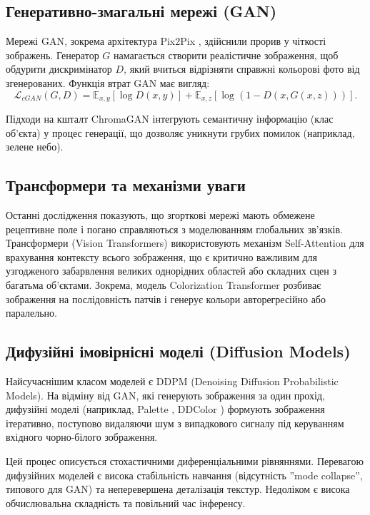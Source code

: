     \subsection{Генеративно-змагальні мережі (GAN)}
        Мережі GAN, зокрема архітектура Pix2Pix \cite{2017-image-to-image-translation}, здійснили прорив у чіткості зображень.
        Генератор $G$ намагається створити реалістичне зображення, щоб обдурити дискримінатор $D$, який вчиться відрізняти справжні кольорові фото від згенерованих.
        Функція втрат GAN має вигляд:
        $$ \mathcal{L}_{cGAN}(G, D) = \mathbb{E}_{x, y}[\log D(x, y)] + \mathbb{E}_{x, z}[\log(1 - D(x, G(x, z)))]. $$
    
    Підходи на кшталт ChromaGAN \cite{2020-chromagan} інтегрують семантичну інформацію (клас об'єкта) у процес генерації, що дозволяє уникнути грубих помилок (наприклад, зелене небо).

    \subsection{Трансформери та механізми уваги}
        Останні дослідження \cite{2021-colorization-transformer, 2022-unicolor} показують, що згорткові мережі мають обмежене рецептивне поле і погано справляються з моделюванням глобальних зв'язків.
        Трансформери (Vision Transformers) використовують механізм Self-Attention для врахування контексту всього зображення, що є критично важливим для узгодженого забарвлення великих однорідних областей або складних сцен з багатьма об'єктами.
        Зокрема, модель Colorization Transformer розбиває зображення на послідовність патчів і генерує кольори авторегресійно або паралельно.

    \subsection{Дифузійні імовірнісні моделі (Diffusion Models)}
        Найсучаснішим класом моделей є DDPM (Denoising Diffusion Probabilistic Models).
        На відміну від GAN, які генерують зображення за один прохід, дифузійні моделі (наприклад, Palette \cite{2022-palette-image-to-image-diffusion-models}, DDColor \cite{2023-ddcolor}) формують зображення ітеративно, поступово видаляючи шум з випадкового сигналу під керуванням вхідного чорно-білого зображення.


        Цей процес описується стохастичними диференціальними рівняннями.
        Перевагою дифузійних моделей є висока стабільність навчання (відсутність ''mode collapse'', типового для GAN) та неперевершена деталізація текстур.
        Недоліком є висока обчислювальна складність та повільний час інференсу.

